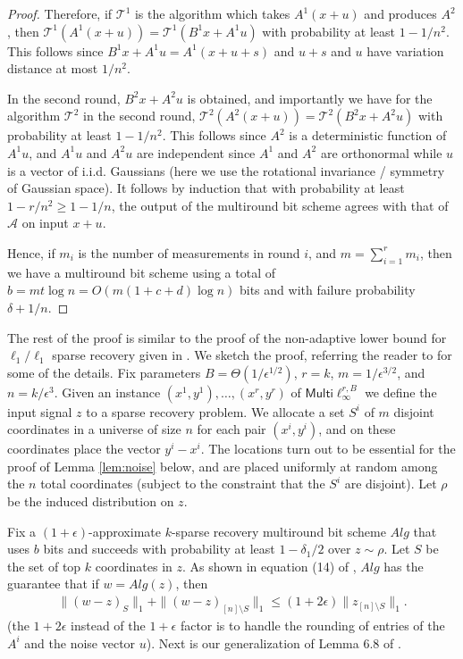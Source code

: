 \documentclass[twoside,leqno,twocolumn]{article}
\newcommand{\multiLinf}{\mathsf{Multi}\ell_{\infty}}
\def\eps{\epsilon}
\begin{document}
\begin{proof}
Therefore, if $\mathcal{T}^1$ is the algorithm which
  takes $A^1(x+u)$ and produces $A^2$, then 
  $\mathcal{T}^1(A^1(x+u)) = \mathcal{T}^1(B^1x + A^1u)$ with probability
  at least $1-1/n^2$. This follows since $B^1x+A^1u = A^1(x + u + s)$
  and $u+s$ and $u$ have variation distance at most $1/n^2$. 

In the second round, $B^2 x + A^2u$ is obtained,
  and importantly we have for the algorithm $\mathcal{T}^2$ in the second round,
  $\mathcal{T}^2(A^2(x+u)) = \mathcal{T}^2(B^2x + A^2u)$ with probability
  at least $1-1/n^2$. This follows
  since $A^2$ is a deterministic function of $A^1u$, and $A^1u$ and $A^2u$ are independent
  since $A^1$ and $A^2$ are orthonormal while $u$ is a vector of i.i.d. Gaussians (here we
  use the rotational invariance / symmetry of Gaussian space). 
  It follows by induction that with probability at least $1-r/n^2 \geq 1-1/n$, the output
  of the multiround bit scheme agrees with that of $\mathcal{A}$ on input $x + u$.

  Hence, if $m_i$ is the number of measurements in round $i$, and $m =
  \sum_{i=1}^r m_i$, then we have a multiround bit scheme using a
  total of $b = mt\log n = O(m(1 + c+d) \log n)$ bits and with failure
  probability $\delta + 1/n$.
\end{proof}
The rest of the proof is similar to the proof of the non-adaptive lower bound for $\ell_1/\ell_1$
sparse recovery given in \cite{PW11}. We sketch the proof, referring the reader to \cite{PW11}
for some of the details.
Fix parameters $B = \Theta(1/\eps^{1/2})$, $r = k$, $m =
1/\eps^{3/2}$, and $n = k/\eps^3$. Given an instance $(x^1, y^1),
\ldots, (x^r, y^r)$ of $\multiLinf^{r,B}$ we define the input signal
$z$ to a sparse recovery problem. We allocate a set $S^i$ of $m$
disjoint coordinates in a universe of size $n$ for each pair $(x^i,
y^i)$, and on these coordinates place the vector $y^i-x^i$.  The
locations turn out to be essential for the proof of Lemma \ref{lem:noise} below, 
and are placed uniformly at random among the $n$ total coordinates (subject to the
constraint that the $S^i$ are disjoint). 
Let $\rho$ be the induced distribution on $z$.

Fix a $(1+\eps)$-approximate $k$-sparse recovery multiround bit scheme $Alg$ that
uses $b$ bits and succeeds with
probability at least $1-\delta_1/2$ over $z \sim \rho$.  
Let $S$ be the set of top
$k$ coordinates in $z$. As shown in equation (14) of \cite{PW11},
$Alg$ has the guarantee that if $w = Alg(z)$, then
\begin{eqnarray}\label{eqn:main}
\|(w-z)_S\|_1 + \|(w-z)_{[n] \setminus S}\|_1 \leq (1+2\eps)\|z_{[n] \setminus S}\|_1.
\end{eqnarray}
(the $1+2\eps$ instead of the $1+\eps$ factor is to handle the rounding of entries of
the $A^i$ and the noise vector $u$). 
Next is our generalization of Lemma 6.8 of \cite{PW11}.
\end{document}
